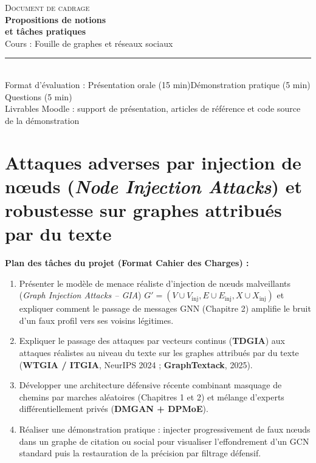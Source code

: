 \documentclass[11pt, a4paper]{article}
\begin{document}
\begin{center}
    {\small\sffamily\scshape\color{secondary}Document de cadrage}\\[8pt]
    {\LARGE\bfseries\color{primary}Propositions de notions\\[-1pt]
    et tâches pratiques}\\[8pt]
    {\large\sffamily Cours : Fouille de graphes et réseaux sociaux}\\[12pt]
    {\color{secondary}\rule{0.16\linewidth}{1pt}}\\[10pt]
    {\small\color{darkgray}Format d'évaluation : Présentation orale (15 min)\quad\textbullet\quad Démonstration pratique (5 min)}\\[3pt]
    {\small\color{darkgray}Questions (5 min)}\\[5pt]
    {\footnotesize\color{darkgray}Livrables Moodle : support de présentation, articles de référence et code source de la démonstration}
\end{center}
\vspace{8pt}
\thispagestyle{plain}

\vspace{4pt}

\section*{\textcolor{primary}{Attaques adverses par injection de nœuds (\textit{Node Injection Attacks}) et robustesse sur graphes attribués par du texte}}

\textbf{\textcolor{secondary}{Plan des tâches du projet (Format Cahier des Charges) :}}
\begin{enumerate}[label=\textbf{\arabic*.}]
    \item Présenter le modèle de menace réaliste d'injection de nœuds malveillants (\textit{Graph Injection Attacks -- GIA}) $G' = (V \cup V_{\text{inj}}, E \cup E_{\text{inj}}, X \cup X_{\text{inj}})$ et expliquer comment le passage de messages GNN (Chapitre 2) amplifie le bruit d'un faux profil vers ses voisins légitimes.
    \item Expliquer le passage des attaques par vecteurs continus (\textbf{TDGIA}) aux attaques réalistes au niveau du texte sur les graphes attribués par du texte (\textbf{WTGIA / ITGIA}, NeurIPS 2024 ; \textbf{GraphTextack}, 2025).
    \item Développer une architecture défensive récente combinant masquage de chemins par marches aléatoires (Chapitres 1 et 2) et mélange d'experts différentiellement privés (\textbf{DMGAN + DPMoE}).
    \item Réaliser une démonstration pratique : injecter progressivement de faux nœuds dans un graphe de citation ou social pour visualiser l'effondrement d'un GCN standard puis la restauration de la précision par filtrage défensif.
\end{enumerate}
\end{document}
